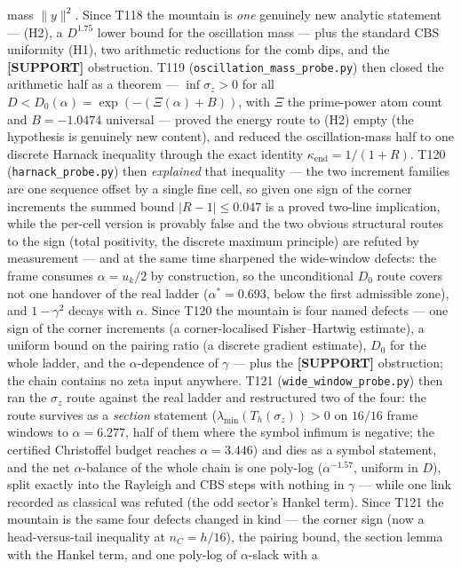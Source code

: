 \documentclass[11pt,a4paper]{article}
\begin{document}
mass $\|y\|^2$. Since T118 the mountain is \emph{one} genuinely new analytic statement ---
(H2), a $D^{1.75}$ lower bound for the oscillation mass --- plus the standard CBS uniformity
(H1), two arithmetic reductions for the comb dips, and the \textbf{[SUPPORT]} obstruction.
T119 (\texttt{oscillation\_mass\_probe.py}) then closed the arithmetic half as a theorem ---
$\inf\sigma_z>0$ for all $D<D_0(\alpha)=\exp(-(\Xi(\alpha)+B))$, with $\Xi$ the prime-power
atom count and $B=-1.0474$ universal --- proved the energy route to (H2) empty (the
hypothesis is genuinely new content), and reduced the oscillation-mass half to one discrete
Harnack inequality through the exact identity $\kappa_{\mathrm{end}}=1/(1+R)$. T120
(\texttt{harnack\_probe.py}) then \emph{explained} that inequality --- the two increment
families are one sequence offset by a single fine cell, so given one sign of the corner
increments the summed bound $|R-1|\le0.047$ is a proved two-line implication, while the
per-cell version is provably false and the two obvious structural routes to the sign (total
positivity, the discrete maximum principle) are refuted by measurement --- and at the same
time sharpened the wide-window defects: the frame consumes $\alpha=u_k/2$ by construction, so
the unconditional $D_0$ route covers not one handover of the real ladder
($\alpha^*=0.693$, below the first admissible zone), and $1-\gamma^2$ decays with $\alpha$.
Since T120 the mountain is four named defects --- one sign of the corner increments
(a corner-localised Fisher--Hartwig estimate), a uniform bound on the pairing ratio (a
discrete gradient estimate), $D_0$ for the whole ladder, and the $\alpha$-dependence of
$\gamma$ --- plus the \textbf{[SUPPORT]} obstruction; the chain contains no zeta input
anywhere. T121 (\texttt{wide\_window\_probe.py}) then ran the $\sigma_z$ route against the
real ladder and restructured two of the four: the route survives as a \emph{section}
statement ($\lambda_{\min}(T_h(\sigma_z))>0$ on $16/16$ frame windows to $\alpha=6.277$,
half of them where the symbol infimum is negative; the certified Christoffel budget reaches
$\alpha=3.446$) and dies as a symbol statement, and the net $\alpha$-balance of the whole
chain is one poly-log ($\alpha^{-1.57}$, uniform in $D$), split exactly into the Rayleigh
and CBS steps with nothing in $\gamma$ --- while one link recorded as classical was refuted
(the odd sector's Hankel term). Since T121 the mountain is the same four defects changed in
kind --- the corner sign (now a head-versus-tail inequality at $n_C=h/16$), the pairing
bound, the section lemma with the Hankel term, and one poly-log of $\alpha$-slack with a
\end{document}
